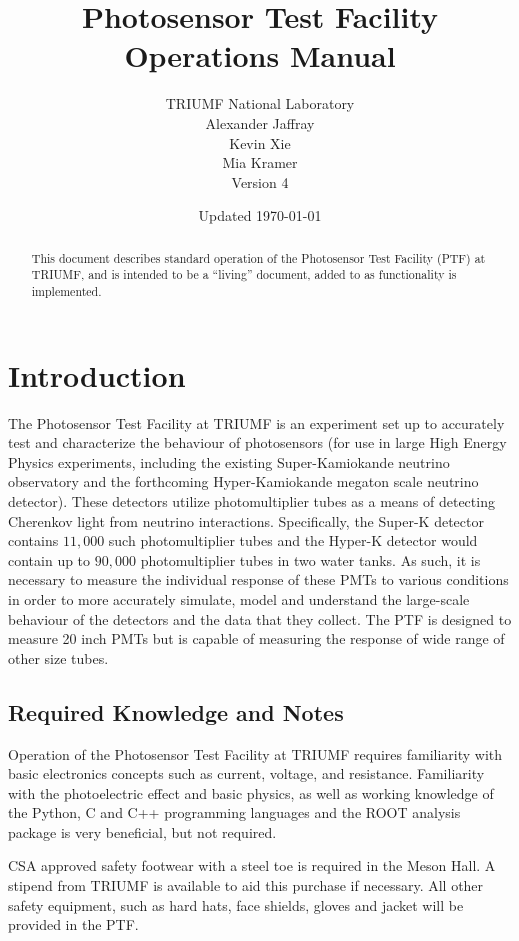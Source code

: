 \documentclass[twoside,letterpaper]{refart}
\title{Photosensor Test Facility Operations Manual}
\author{TRIUMF National Laboratory \\
Alexander Jaffray \\
Kevin Xie \\
Mia Kramer \\
Version 4}
\date{Updated \today}
\begin{document}
\maketitle

\begin{abstract}
	This document describes standard operation of the Photosensor Test Facility (PTF) at TRIUMF, and is intended to be a ``living'' document, added to as functionality is implemented.
\end{abstract}
\tableofcontents

\newpage



\section{Introduction}

The Photosensor Test Facility at TRIUMF is an experiment set up to accurately test and characterize the behaviour of photosensors (for use in large High Energy Physics experiments, including the existing Super-Kamiokande neutrino observatory and the forthcoming Hyper-Kamiokande megaton scale neutrino detector). These detectors utilize photomultiplier tubes as a means of detecting Cherenkov light from neutrino interactions. Specifically, the Super-K detector contains $11,000$ such photomultiplier tubes and the Hyper-K detector would contain up to $90,000$ photomultiplier tubes in two water tanks. As such, it is necessary to measure the individual response of these PMTs to various conditions in order to more accurately simulate, model and understand the large-scale behaviour of the detectors and the data that they collect. The PTF is designed to measure 20 inch PMTs but is capable of measuring the response of wide range of other size tubes.

\subsection{Required Knowledge and Notes}

Operation of the Photosensor Test Facility at TRIUMF requires familiarity with basic electronics concepts such as current, voltage, and resistance. Familiarity with the photoelectric effect and basic physics, as well as working knowledge of the Python, C and C++ programming languages and the ROOT analysis package is very beneficial, but not required.

CSA approved safety footwear with a steel toe is required in the Meson Hall. A stipend from TRIUMF is available to aid this purchase if necessary. All other safety equipment, such as hard hats, face shields, gloves and jacket will be provided in the PTF.
\end{document}

